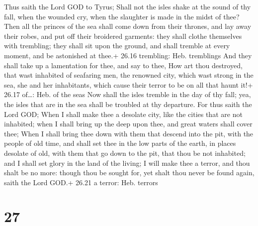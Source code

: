  Thus saith the Lord GOD to Tyrus; Shall not the isles
shake at the sound of thy fall, when the wounded cry, when the slaughter
is made in the midst of thee?  Then all the princes of the
sea shall come down from their thrones, and lay away their robes, and
put off their broidered garments: they shall clothe themselves with
trembling; they shall sit upon the ground, and shall tremble at every
moment, and be astonished at thee.+ 26.16 trembling: Heb. tremblings
 And they shall take up a lamentation for thee, and say to
thee, How art thou destroyed, that wast inhabited of seafaring men, the
renowned city, which wast strong in the sea, she and her inhabitants,
which cause their terror to be on all that haunt it!+ 26.17 of\ldots:
Heb. of the seas  Now shall the isles tremble in the day of
thy fall; yea, the isles that are in the sea shall be troubled at thy
departure.  For thus saith the Lord GOD; When I shall make
thee a desolate city, like the cities that are not inhabited; when I
shall bring up the deep upon thee, and great waters shall cover thee;
 When I shall bring thee down with them that descend into
the pit, with the people of old time, and shall set thee in the low
parts of the earth, in places desolate of old, with them that go down to
the pit, that thou be not inhabited; and I shall set glory in the land
of the living;  I will make thee a terror, and thou shalt
be no more: though thou be sought for, yet shalt thou never be found
again, saith the Lord GOD.+ 26.21 a terror: Heb. terrors

\hypertarget{section-26}{%
\section{27}\label{section-26}}

